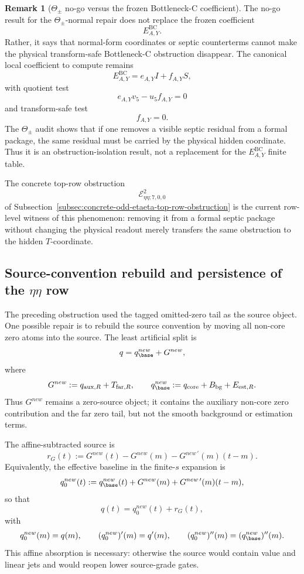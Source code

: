 \documentclass[11pt,a4paper]{amsart}
\def\new{new}%
\theoremstyle{plain}
\theoremstyle{definition}
\newtheorem{remark}[theorem]{Remark}
\newcommand{\new}{\mathrm{new}}
\begin{document}
\begin{remark}[\(\Theta_\pm\) no-go versus the frozen Bottleneck-C coefficient]
\label{rem:theta-nogo-versus-frozen-bc-coefficient}
The no-go result for the \(\Theta_\pm\)-normal repair does not replace the
frozen coefficient
\[
E_{A,Y}^{\mathrm{BC}}.
\]
Rather, it says that normal-form coordinates or septic counterterms cannot
make the physical transform-safe Bottleneck-C obstruction disappear.  The
canonical local coefficient to compute remains
\[
E_{A,Y}^{\mathrm{BC}}
=
e_{A,Y}I+f_{A,Y}S,
\]
with quotient test
\[
e_{A,Y}v_5-u_5f_{A,Y}=0
\]
and transform-safe test
\[
f_{A,Y}=0.
\]
The \(\Theta_\pm\) audit shows that if one removes a visible septic residual
from a formal package, the same residual must be carried by the physical
hidden coordinate.  Thus it is an obstruction-isolation result, not a
replacement for the \(E_{A,Y}^{\mathrm{BC}}\) finite table.

The concrete top-row obstruction
\[
\mathcal E^{2}_{\eta\eta;7,0,0}
\]
of Subsection~\ref{subsec:concrete-odd-etaeta-top-row-obstruction} is the
current row-level witness of this phenomenon: removing it from a formal septic
package without changing the physical readout merely transfers the same
obstruction to the hidden \(T\)-coordinate.
\end{remark}

\subsection{Source-convention rebuild and persistence of the \(\eta\eta\) row}
\label{subsec:source-convention-rebuild-etaeta-row}

The preceding obstruction used the tagged omitted-zero tail as the source
object.  One possible repair is to rebuild the source convention by moving all
non-core zero atoms into the source.  The least artificial split is
\[
q
=
q_{\base}^{\new}
+
G^{\new},
\]
where
\[
G^{\new}
:=
q_{\mathrm{aux},R}+T_{\mathrm{far},R},
\qquad
q_{\base}^{\new}
:=
q_{\mathrm{core}}+B_{\mathrm{bg}}+E_{\mathrm{est},R}.
\]
Thus \(G^{\new}\) remains a zero-source object; it contains the auxiliary
non-core zero contribution and the far zero tail, but not the smooth background
or estimation terms.

The affine-subtracted source is
\[
r_G(t)
:=
G^{\new}(t)-G^{\new}(m)-G^{\new\,\prime}(m)(t-m).
\]
Equivalently, the effective baseline in the finite-\(s\) expansion is
\[
q_0^{\new}(t)
:=
q_{\base}^{\new}(t)
+
G^{\new}(m)+G^{\new\,\prime}(m)(t-m),
\]
so that
\[
q(t)=q_0^{\new}(t)+r_G(t),
\]
with
\[
q_0^{\new}(m)=q(m),
\qquad
(q_0^{\new})'(m)=q'(m),
\qquad
(q_0^{\new})''(m)=(q_{\base}^{\new})''(m).
\]
This affine absorption is necessary: otherwise the source would contain value
and linear jets and would reopen lower source-grade gates.
\end{document}
